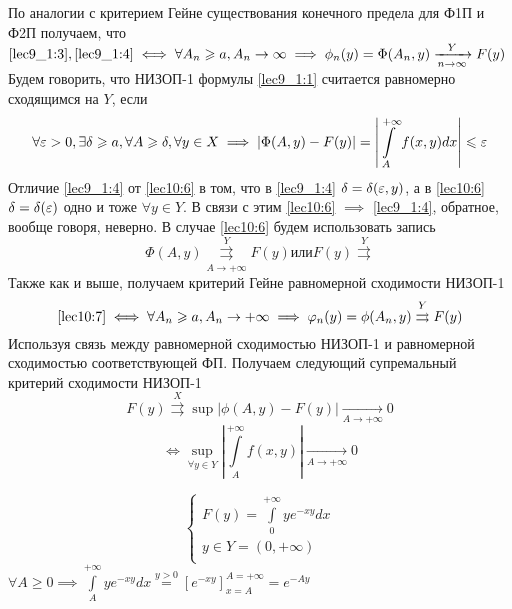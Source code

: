 \documentclass[../../main.tex]{subfiles}
\begin{document}
По аналогии с критерием Гейне существования конечного предела для Ф1П и Ф2П 
получаем, что 
$\eqref{lec9_1:3}, \eqref{lec9_1:4} \iff \forall A_n \ge 
a, A_n \to \infty \implies \phi_n(y) =\Phi(A_n,y) \xrightarrow[n\rightarrow 
\infty]{Y}F(y) $
Будем говорить, что НИЗОП-1 формулы \eqref{lec9_1:1}  считается 
равномерно сходящимся на $Y$, если
\begin{equation}
\label{lec10:6}
\forall \eps > 0, \exists \delta \ge a, \forall A \ge \delta, \forall y\in X 
\implies \left| \Phi(A,y) - F(y) \right| = \left| \int\limits_A^{+\infty} 
f(x,y) dx \right| \le \eps
\end{equation}
Отличие \eqref{lec9_1:4} от \eqref{lec10:6} в том, что в \eqref{lec9_1:4} 
$\delta = 
\delta(\eps,y)$, а в \eqref{lec10:6} $\delta = \delta(\eps)$ одно и тоже 
$\forall y \in Y$. В связи с этим \eqref{lec10:6} $\implies$ \eqref{lec9_1:4}, 
обратное, вообще говоря, неверно. 
В случае \eqref{lec10:6} будем использовать запись \begin{equation}
\label{lec10:7}
\Phi(A,y)\overset{Y}{\underset{A \to +\infty}{\rightrightarrows}}F(y) или 
F(y)\overset{Y}{\rightrightarrows}
\end{equation}
Также как и выше, получаем критерий Гейне равномерной сходимости НИЗОП-1 
\begin{equation}
\label{lec10:8}
 \eqref{lec10:7} \iff \forall A_n \ge a, A_n\rightarrow +\infty \implies 
 \varphi_n(y) = \phi(A_n,y) \overset{Y}\rightrightarrows F(y) 
\end{equation}
Используя связь между равномерной сходимостью НИЗОП-1 и равномерной 
сходимостью соответствующей ФП. Получаем следующий супремальный критерий 
сходимости НИЗОП-1 
\begin{equation}
\label{lec10:9}
F(y)\overset{X} \rightrightarrows \sup\left|\phi(A , y) - F(y) \right| 
\underset{A \to + \infty}\to 0 \end{equation}
\begin{equation}
\label{lec10:10}\iff \underset{\forall y \in 
Y}\sup\left|\int\limits_A^{+\infty} f(x,y)\right| \underset{A \to + \infty} 
\to 0  \end{equation}

\[ \left\{\begin{array}{rcl}
		F(y)=\int\limits_0^{+\infty}ye^{-xy}dx\\
		y \in Y = (0,+\infty)\\
		\end{array}
		\right. \]
$\forall A \ge 0 \implies \int\limits_A^{+\infty}ye^{-xy}dx \overset{y > 0} = 
\left[e^{-xy} \right]_{x = A}^{A = +\infty} = e^{-Ay} $
\end{document}
